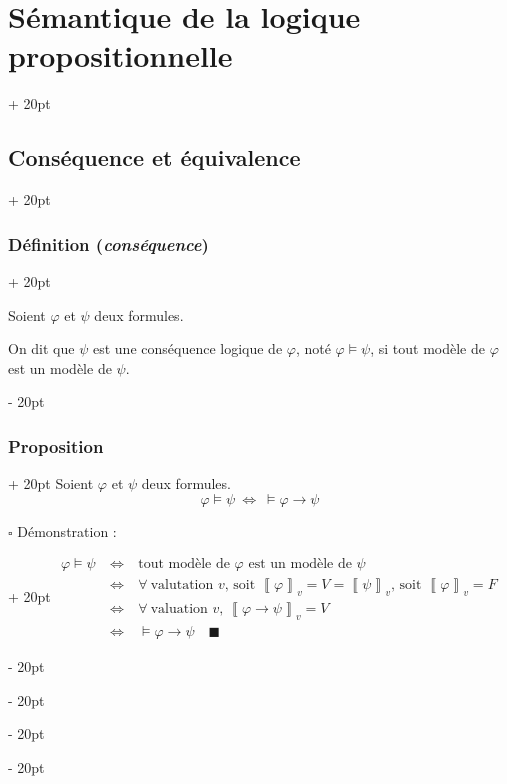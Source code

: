 \documentclass[a4paper, 12pt, twoside]{article}
\newcommand{\lrbb}[1]{\left\llbracket #1 \right\rrbracket}
\newcommand{\ssi}{\ \Leftrightarrow \ }
\newcommand{\ind}[1][20pt]{\advance\leftskip + #1}
\newcommand{\deind}[1][20pt]{\advance\leftskip - #1}
\newenvironment{indt}[2][20pt]{#2 \par \ind[#1]}{\par \deind} %
\begin{document}
\begin{indt}{\section{Sémantique de la logique propositionnelle}}
        \begin{indt}{\subsection{Conséquence et équivalence}}
            \begin{indt}{\subsubsection{Définition (\textit{conséquence})}}
                \label{3.2.1}
                
                Soient $\varphi$ et $\psi$ deux formules.
                
                On dit que $\psi$ est une conséquence logique de $\varphi$, noté $\varphi \vDash \psi$, si tout modèle de $\varphi$ est un modèle de $\psi$.
            \end{indt}
            
            \vspace{12pt}
            
            \begin{indt}{\subsubsection{Proposition}}
                Soient $\varphi$ et $\psi$ deux formules.
                    \[ \varphi \vDash \psi \ssi \vDash \varphi \rightarrow \psi \]
                
                \begin{indt}{$\square$ Démonstration :}
                    $
                        \begin{array}{rcl}
                            \varphi \vDash \psi &\ssi& \text{tout modèle de $\varphi$ est un modèle de $\psi$}
                            \\
                            &\ssi& \forall\ \text{valutation $v$, soit $\lrbb \varphi _v = V = \lrbb{\psi}_v$, soit $\lrbb{\varphi}_v = F$}
                            \\
                            &\ssi& \forall\ \text{valuation $v$, $\lrbb{\varphi \rightarrow \psi}_v = V$}
                            \\
                            &\ssi& \vDash \varphi \rightarrow \psi \quad \blacksquare
                        \end{array}
                    $
                \end{indt}
            \end{indt}
            

\end{indt}
\end{indt}
\end{document}
